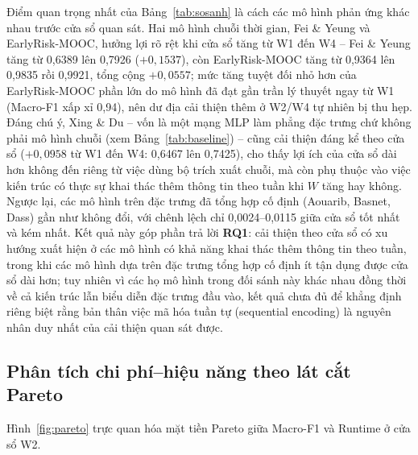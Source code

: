 Điểm quan trọng nhất của Bảng~\ref{tab:sosanh} là cách các mô hình phản ứng khác nhau trước cửa sổ quan sát. Hai mô hình chuỗi thời gian, Fei \& Yeung và EarlyRisk-MOOC, hưởng lợi rõ rệt khi cửa sổ tăng từ W1 đến W4 -- Fei \& Yeung tăng từ 0,6389 lên 0,7926 ($+0{,}1537$), còn EarlyRisk-MOOC tăng từ 0,9364 lên 0,9835 rồi 0,9921, tổng cộng $+0{,}0557$; mức tăng tuyệt đối nhỏ hơn của EarlyRisk-MOOC phần lớn do mô hình đã đạt gần trần lý thuyết ngay từ W1 (Macro-F1 xấp xỉ 0,94), nên dư địa cải thiện thêm ở W2/W4 tự nhiên bị thu hẹp. Đáng chú ý, Xing \& Du -- vốn là một mạng MLP làm phẳng đặc trưng chứ không phải mô hình chuỗi (xem Bảng~\ref{tab:baseline}) -- cũng cải thiện đáng kể theo cửa sổ ($+0{,}0958$ từ W1 đến W4: 0,6467 lên 0,7425), cho thấy lợi ích của cửa sổ dài hơn không đến riêng từ việc dùng bộ trích xuất chuỗi, mà còn phụ thuộc vào việc kiến trúc có thực sự khai thác thêm thông tin theo tuần khi $W$ tăng hay không. Ngược lại, các mô hình trên đặc trưng đã tổng hợp cố định (Aouarib, Basnet, Dass) gần như không đổi, với chênh lệch chỉ 0,0024--0,0115 giữa cửa sổ tốt nhất và kém nhất. Kết quả này góp phần trả lời \textbf{RQ1}: cải thiện theo cửa sổ có xu hướng xuất hiện ở các mô hình có khả năng khai thác thêm thông tin theo tuần, trong khi các mô hình dựa trên đặc trưng tổng hợp cố định ít tận dụng được cửa sổ dài hơn; tuy nhiên vì các họ mô hình trong đối sánh này khác nhau đồng thời về cả kiến trúc lẫn biểu diễn đặc trưng đầu vào, kết quả chưa đủ để khẳng định riêng biệt rằng bản thân việc mã hóa tuần tự (sequential encoding) là nguyên nhân duy nhất của cải thiện quan sát được.

\subsection{Phân tích chi phí--hiệu năng theo lát cắt Pareto}

Hình~\ref{fig:pareto} trực quan hóa mặt tiền Pareto giữa Macro-F1 và Runtime ở cửa sổ W2.


